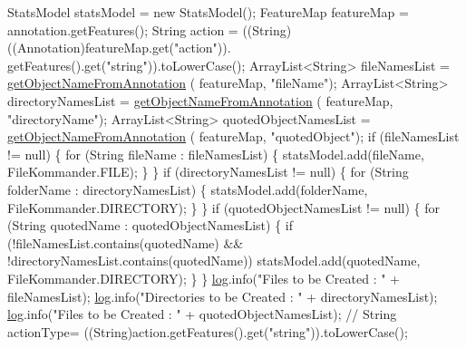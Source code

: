 \begin{DoxyCode}
        StatsModel statsModel = \textcolor{keyword}{new} StatsModel();
        FeatureMap featureMap = annotation.getFeatures();
        String action = ((String)((Annotation)featureMap.get(\textcolor{stringliteral}{"action"})).
      getFeatures().get(\textcolor{stringliteral}{"string"})).toLowerCase();
        ArrayList<String> fileNamesList = \hyperlink{classcom_1_1poly_1_1nlp_1_1filekommander_1_1file_1_1actions_1_1_analyse_action_a8652e1bba48585a8c416e6e212fe4766}{getObjectNameFromAnnotation}
      (
                featureMap, \textcolor{stringliteral}{"fileName"});
        ArrayList<String> directoryNamesList = \hyperlink{classcom_1_1poly_1_1nlp_1_1filekommander_1_1file_1_1actions_1_1_analyse_action_a8652e1bba48585a8c416e6e212fe4766}{getObjectNameFromAnnotation}
      (
                featureMap, \textcolor{stringliteral}{"directoryName"});
        ArrayList<String> quotedObjectNamesList = \hyperlink{classcom_1_1poly_1_1nlp_1_1filekommander_1_1file_1_1actions_1_1_analyse_action_a8652e1bba48585a8c416e6e212fe4766}{getObjectNameFromAnnotation}
      (
                featureMap, \textcolor{stringliteral}{"quotedObject"});
        \textcolor{keywordflow}{if} (fileNamesList != null) \{
            \textcolor{keywordflow}{for} (String fileName : fileNamesList) \{
                statsModel.add(fileName, FileKommander.FILE);
            \}
        \}
        \textcolor{keywordflow}{if} (directoryNamesList != null) \{
            \textcolor{keywordflow}{for} (String folderName : directoryNamesList) \{
                statsModel.add(folderName, FileKommander.DIRECTORY);
            \}
        \}
        \textcolor{keywordflow}{if} (quotedObjectNamesList != null) \{
            \textcolor{keywordflow}{for} (String quotedName : quotedObjectNamesList) \{
                \textcolor{keywordflow}{if} (!fileNamesList.contains(quotedName)
                        && !directoryNamesList.contains(quotedName))
                    statsModel.add(quotedName, FileKommander.DIRECTORY);
            \}
        \}
        \hyperlink{classcom_1_1poly_1_1nlp_1_1filekommander_1_1file_1_1actions_1_1_analyse_action_ae99df52b353dd7b0d2014d581fcc8cff}{log}.info(\textcolor{stringliteral}{"Files to be Created : "} + fileNamesList);
        \hyperlink{classcom_1_1poly_1_1nlp_1_1filekommander_1_1file_1_1actions_1_1_analyse_action_ae99df52b353dd7b0d2014d581fcc8cff}{log}.info(\textcolor{stringliteral}{"Directories to be Created : "} + directoryNamesList);
        \hyperlink{classcom_1_1poly_1_1nlp_1_1filekommander_1_1file_1_1actions_1_1_analyse_action_ae99df52b353dd7b0d2014d581fcc8cff}{log}.info(\textcolor{stringliteral}{"Files to be Created : "} + quotedObjectNamesList);
    \textcolor{comment}{//  String actionType=
       ((String)action.getFeatures().get("string")).toLowerCase();}


\end{DoxyCode}
